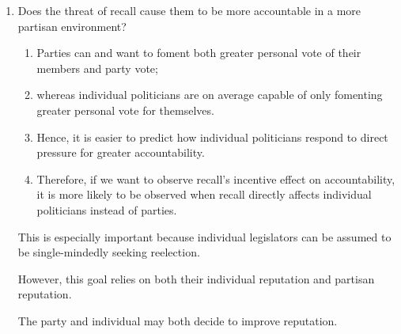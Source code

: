 \documentclass[hyphens, crop=false]{standalone}
\begin{document}
\begin{enumerate}
%				
%				
%			
%			
%			
		
		\item 
		Does the threat of recall cause them to be more accountable in a more partisan environment?
		
		\begin{enumerate}
			\item Parties can and want to foment both greater personal vote of their members and party vote;
			\item
			whereas individual politicians are on average capable of only fomenting greater personal vote for themselves.
			\item
			Hence,
			it is easier to predict how individual politicians respond to direct pressure for greater accountability.
			\item 
			Therefore, if we want to observe recall's incentive effect on accountability,
			it is more likely to be observed when recall directly affects individual politicians instead of parties.
		\end{enumerate}
		
		
		
		
		This is especially important because individual legislators can be assumed to be single-mindedly seeking reelection.
		
		However, this goal relies on both their individual reputation and partisan reputation.
		
		The party and individual may both decide to improve reputation.
		
	\end{enumerate}
	

	\newpage
	
\end{document}
